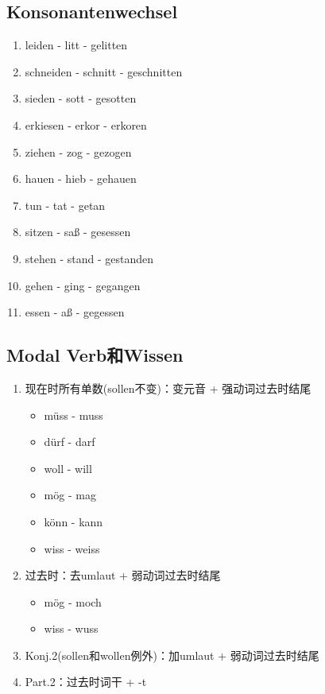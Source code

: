\documentclass[UTF8]{report}
\begin{document}
\subsection{Konsonantenwechsel}
\begin{enumerate}
    \item leiden - litt - gelitten
    \item schneiden - schnitt - geschnitten
    \item sieden - sott - gesotten
    \item erkiesen - erkor - erkoren
    \item ziehen - zog - gezogen
    \item hauen - hieb - gehauen
    \item tun - tat - getan
    \item sitzen - saß - gesessen
    \item stehen - stand - gestanden
    \item gehen - ging - gegangen
    \item essen - aß - gegessen
\end{enumerate}

\subsection{Modal Verb和Wissen}
\begin{enumerate}
    \item 现在时所有单数(sollen不变)：变元音 + 强动词过去时结尾
    \begin{itemize}
        \item müss - muss
        \item dürf - darf
        \item woll - will
        \item mög - mag
        \item könn - kann
        \item wiss - weiss
    \end{itemize}
    \item 过去时：去umlaut + 弱动词过去时结尾
    \begin{itemize}
        \item mög - moch
        \item wiss - wuss
    \end{itemize}
    \item Konj.2(sollen和wollen例外)：加umlaut + 弱动词过去时结尾
    \item Part.2：过去时词干 + -t
\end{enumerate}
\end{document}
